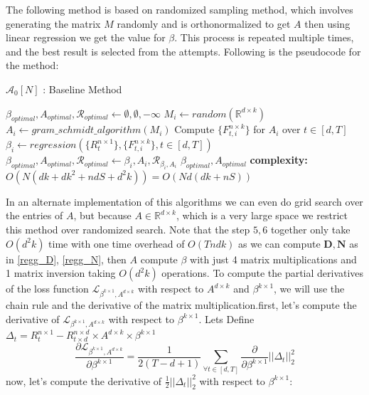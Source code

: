 The following method is based on randomized sampling method, which involves generating the matrix $M$ randomly and is orthonormalized to get $A$ then using linear regression we get the value for $\beta$. This process is repeated multiple times, and the best result is selected from the attempts.
Following is the pseudocode for the method:
\begin{algorithm}[H]
\caption{$\mathcal{A}_{0}[N]$ : Baseline Method}\label{lfm_baseline_method}
\begin{algorithmic}[1]
\State $\beta_{optimal}, A_{optimal}, \mathcal{R}_{optimal} \gets \emptyset, \emptyset, -\infty $
    \State $M_i \gets random(\mathbb{R}^{d\times k})$
    \State $A_i \gets gram\_schmidt\_algorithm(M_i)$
    \State Compute $\{F^{n\times k}_{t, i}\}$ for $A_i$ over $t\in [d,T]$
    \State $\beta_i \gets regression(\{R^{n\times 1}_{t}\},\{F^{n\times k}_{t, i}\}, t\in [d,T])$
      
        \State $\beta_{optimal}, A_{optimal}, \mathcal{R}_{optimal} \gets \beta_{i}, A_{i}, \mathcal{R}_{\beta_i, A_i} $
    \EndIf 
\EndFor
\State \Return  $\beta_{optimal}, A_{optimal}$
\State \textbf{complexity: } $O(N(dk+dk^2+ndS+d^2k)) = 
 O(Nd(dk+nS))$
\end{algorithmic}
\end{algorithm} In an alternate implementation of this algorithms we can even do grid search over the entries of $A$, but because $A\in \mathbb{R}^{d\times k}$, which is a very large space we restrict this method over randomized search. Note that the step $5,6$ together only take $O(d^2k)$ time with one time overhead of $O(Tndk)$ as we can compute $\mathbf{D}, \mathbf{N}$ as in \ref{regg_D}, \ref{regg_N}, then $A$ compute $\beta$ with just 4 matrix multiplications and 1 matrix inversion taking $O(d^2k)$ operations.
To compute the partial derivatives of the loss function $\mathcal{L}_{\beta^{k \times 1}, A^{d\times k}}$ with respect to $A^{d\times k}$ and $\beta^{k \times 1}$, we will use the chain rule and the derivative of the matrix multiplication.\newline \newline first, let's compute the derivative of $\mathcal{L}_{\beta^{k \times 1}, A^{d\times k}}$ with respect to $\beta^{k \times 1}$. Lets Define $\Delta_t = R^{n\times 1}_t-R^{n\times d}_{t\times d}\times A^{d\times k} \times \beta^{k \times 1}$
\begin{equation}
    \frac{\partial \mathcal{L}_{\beta^{k \times 1}, A^{d\times k}}}{\partial \beta^{k \times 1}} = \frac{1}{2(T-d+1)} \sum_{\forall t\in [d,T]} \frac{\partial}{\partial \beta^{k \times 1}} ||\Delta_t||_2^2 
\end{equation}
\newline now, let's compute the derivative of $\frac{1}{2}||\Delta_t||_2^2$ with respect to $\beta^{k\times 1}$:

